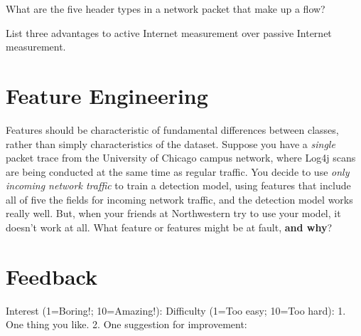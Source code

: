 What are the five header types in a network packet that make up a flow?

\eprob

List three advantages to active Internet measurement over passive Internet measurement.

\eprob


\section*{Feature Engineering}

Features should be characteristic of fundamental differences between classes, rather than
simply characteristics of the dataset. Suppose you have a {\em single} packet
trace from the University of Chicago campus network, where Log4j scans are
being conducted at the same time as regular traffic.
You decide to use {\em only incoming network traffic} to train a detection model, using
features that include all of five the fields for incoming network
traffic, and the detection model works really well. But, when your friends at
Northwestern try
to use your model, it doesn't work at all. What feature or features might be at fault,
{\bf and why}?

\eprob

\section*{Feedback}
Interest (1=Boring!; 10=Amazing!):
Difficulty (1=Too easy; 10=Too hard):
\eprob
{}
1. One thing you like. 2. One suggestion for improvement:

\eprob


